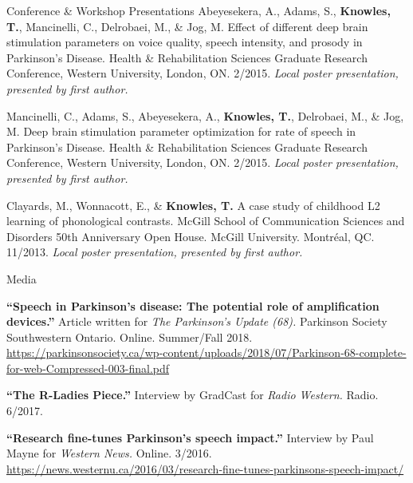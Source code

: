 \documentclass{resume} %
\begin{document}
\begin{rSection}{Conference \& Workshop Presentations}
	Abeyesekera, A., Adams, S., {\bf Knowles, T.}, Mancinelli, C., Delrobaei, M., \& Jog, M. Effect of different deep brain stimulation parameters on voice quality, speech intensity, and prosody in Parkinson's Disease. Health \& Rehabilitation Sciences Graduate Research Conference, Western University, London, ON. 2/2015.  \emph{Local poster presentation, presented by first author.}
	
	Mancinelli, C., Adams, S., Abeyesekera, A., {\bf Knowles, T.}, Delrobaei, M., \& Jog, M. Deep brain stimulation parameter optimization for rate of speech in Parkinson's Disease. Health \& Rehabilitation Sciences Graduate Research Conference, Western University, London, ON. 2/2015. \emph{Local poster presentation, presented by first author.}

	Clayards, M., Wonnacott, E., \& {\bf Knowles, T.} A case study of childhood L2 learning of phonological contrasts. McGill School of Communication Sciences and Disorders 50th Anniversary Open House. McGill University. Montr\'eal, QC. 11/2013. \emph{Local poster presentation, presented by first author.}

\end{rSection}

\begin{rSection}{Media}

{\bf ``Speech in Parkinson's disease: The potential role of amplification devices.''} Article written for \textit{The Parkinson's Update (68).} Parkinson Society Southwestern Ontario. Online. Summer/Fall 2018. \url{https://parkinsonsociety.ca/wp-content/uploads/2018/07/Parkinson-68-complete-for-web-Compressed-003-final.pdf}

{\bf ``The R-Ladies Piece.''} Interview by GradCast for \textit{Radio Western.} Radio. 6/2017.

{\bf ``Research fine-tunes Parkinson's speech impact.''} Interview by Paul Mayne for \textit{Western News.} Online. 3/2016. \url{https://news.westernu.ca/2016/03/research-fine-tunes-parkinsons-speech-impact/}

\end{rSection}
\end{document}
